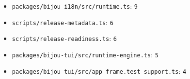 \begin{itemize}
\tightlist
\item
  \texttt{p\allowbreak{}a\allowbreak{}c\allowbreak{}k\allowbreak{}a\allowbreak{}g\allowbreak{}e\allowbreak{}s\allowbreak{}/\allowbreak{}b\allowbreak{}i\allowbreak{}j\allowbreak{}o\allowbreak{}u\allowbreak{}-\allowbreak{}i\allowbreak{}1\allowbreak{}8\allowbreak{}n\allowbreak{}/\allowbreak{}s\allowbreak{}r\allowbreak{}c\allowbreak{}/\allowbreak{}r\allowbreak{}u\allowbreak{}n\allowbreak{}t\allowbreak{}i\allowbreak{}m\allowbreak{}e\allowbreak{}.\allowbreak{}t\allowbreak{}s}: \texttt{9}
\item
  \texttt{s\allowbreak{}c\allowbreak{}r\allowbreak{}i\allowbreak{}p\allowbreak{}t\allowbreak{}s\allowbreak{}/\allowbreak{}r\allowbreak{}e\allowbreak{}l\allowbreak{}e\allowbreak{}a\allowbreak{}s\allowbreak{}e\allowbreak{}-\allowbreak{}m\allowbreak{}e\allowbreak{}t\allowbreak{}a\allowbreak{}d\allowbreak{}a\allowbreak{}t\allowbreak{}a\allowbreak{}.\allowbreak{}t\allowbreak{}s}: \texttt{6}
\item
  \texttt{s\allowbreak{}c\allowbreak{}r\allowbreak{}i\allowbreak{}p\allowbreak{}t\allowbreak{}s\allowbreak{}/\allowbreak{}r\allowbreak{}e\allowbreak{}l\allowbreak{}e\allowbreak{}a\allowbreak{}s\allowbreak{}e\allowbreak{}-\allowbreak{}r\allowbreak{}e\allowbreak{}a\allowbreak{}d\allowbreak{}i\allowbreak{}n\allowbreak{}e\allowbreak{}s\allowbreak{}s\allowbreak{}.\allowbreak{}t\allowbreak{}s}: \texttt{6}
\item
  \texttt{p\allowbreak{}a\allowbreak{}c\allowbreak{}k\allowbreak{}a\allowbreak{}g\allowbreak{}e\allowbreak{}s\allowbreak{}/\allowbreak{}b\allowbreak{}i\allowbreak{}j\allowbreak{}o\allowbreak{}u\allowbreak{}-\allowbreak{}t\allowbreak{}u\allowbreak{}i\allowbreak{}/\allowbreak{}s\allowbreak{}r\allowbreak{}c\allowbreak{}/\allowbreak{}r\allowbreak{}u\allowbreak{}n\allowbreak{}t\allowbreak{}i\allowbreak{}m\allowbreak{}e\allowbreak{}-\allowbreak{}e\allowbreak{}n\allowbreak{}g\allowbreak{}i\allowbreak{}n\allowbreak{}e\allowbreak{}.\allowbreak{}t\allowbreak{}s}: \texttt{5}
\item
  \texttt{p\allowbreak{}a\allowbreak{}c\allowbreak{}k\allowbreak{}a\allowbreak{}g\allowbreak{}e\allowbreak{}s\allowbreak{}/\allowbreak{}b\allowbreak{}i\allowbreak{}j\allowbreak{}o\allowbreak{}u\allowbreak{}-\allowbreak{}t\allowbreak{}u\allowbreak{}i\allowbreak{}/\allowbreak{}s\allowbreak{}r\allowbreak{}c\allowbreak{}/\allowbreak{}a\allowbreak{}p\allowbreak{}p\allowbreak{}-\allowbreak{}f\allowbreak{}r\allowbreak{}a\allowbreak{}m\allowbreak{}e\allowbreak{}.\allowbreak{}t\allowbreak{}e\allowbreak{}s\allowbreak{}t\allowbreak{}-\allowbreak{}s\allowbreak{}u\allowbreak{}p\allowbreak{}p\allowbreak{}o\allowbreak{}r\allowbreak{}t\allowbreak{}.\allowbreak{}t\allowbreak{}s}: \texttt{4}

\end{itemize}
